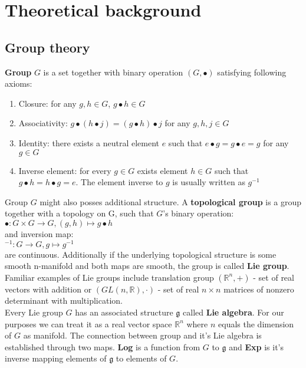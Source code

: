 \section{Theoretical background}

\subsection{Group theory}
    \textbf{Group} $G$ is a set together with binary operation $\left(G, \bullet \right)$ satisfying
    following axioms:
    \begin{enumerate}
        \item Closure: for any $g, h \in G$, $g \bullet h \in G$
        \item Associativity:  $g\bullet \left(h \bullet j \right) =
                    \left(g \bullet h \right) \bullet j$ for any $g,h,j \in G$
        \item Identity: there exists a neutral element $e$ such that
                $e \bullet g = g \bullet e = g$ for any $g \in G$
        \item Inverse element: for every $g \in G$ exists element $h \in G$ such that
                $g \bullet h = h\bullet g = e$. The element inverse to $g$ is usually
                written as $g^{-1}$
    \end{enumerate}
    \par Group $G$ might also posses additional structure. A \textbf{topological group}
        is a group together with a topology on G, such that $G$'s binary operation:\\
        \hspace*{0.5cm} $\bullet: G \times G \to G, \left(g,h \right) \mapsto g\bullet h$ \\
        and inversion map: \\
        \hspace*{0.5cm} ${}^{-1}: G \to G, g \mapsto g^{-1}$ \\
        are continuous. Additionally if the underlying topological structure
        is some smooth n-manifold and both maps are smooth, the group is called
        \textbf{Lie group}. Familiar examples of Lie groups include translation group
        $\left( \mathbb{R}^n, + \right)$ - set of real vectors with addition or
        $\left(GL(n,\mathbb{R}), \cdot \right)$ - set of real $n \times n$ matrices of nonzero determinant
        with multiplication.\\
        Every Lie group $G$ has an associated structure $\mathfrak{g}$ called \textbf{Lie
        algebra}. For our purposes we can treat it as a real vector space
        $\mathbb{R}^n$ where $n$ equals the dimension of $G$ as manifold. The
        connection between group and it's Lie algebra is established through two
        maps. \textbf{Log} is a function from $G$ to $\mathfrak{g}$ and \textbf{Exp} is it's inverse
        mapping elements of $\mathfrak{g}$ to elements of $G$.


